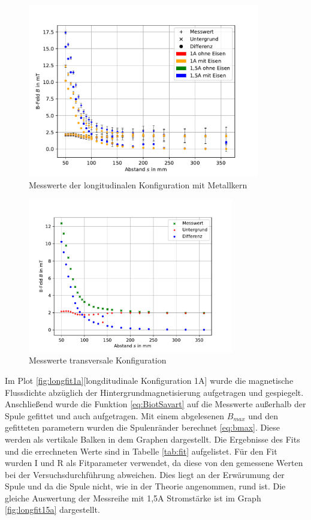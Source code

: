 \documentclass[11pt, a4paper]{article}
\begin{document}
    \begin{figure}[h]
        \centering
        \includegraphics[width=0.9\textwidth]{mitKernRaw.pdf}
        \caption{Messwerte der longitudinalen Konfiguration mit Metallkern}
        \label{fig:longmessmitKern}
    \end{figure}
    \begin{figure}[h]
        \centering
        \includegraphics[width=0.8\textwidth]{raw2.pdf}
        \caption{Messwerte transversale Konfiguration}
        \label{fig:transmess}
    \end{figure}



    Im Plot \ref{fig:longfit1a}[longditudinale Konfiguration 1\si{\ampere}] wurde die magnetische Flussdichte abzüglich der Hintergrundmagnetisierung aufgetragen und gespiegelt. Anschließend wurde die Funktion \ref{eq:BiotSavart} auf die Messwerte außerhalb der Spule gefittet und auch aufgetragen. Mit einem abgelesenen $B_{max}$ und den gefitteten parametern wurden die Spulenränder berechnet \ref{eq:bmax}. Diese werden als vertikale Balken in dem Graphen dargestellt. 
    Die Ergebnisse des Fits und die errechneten Werte sind in Tabelle \ref{tab:fit} aufgelistet. Für den Fit wurden I und R als Fitparameter verwendet, da diese von den gemessene Werten bei der Versuchsdurchführung abweichen. Dies liegt an der Erwärumung der Spule und da die Spule nicht, wie in der Theorie angenommen, rund ist.
    Die gleiche Auswertung der Messreihe mit 1,5A Stromstärke ist im Graph \ref{fig:longfit15a} dargestellt.
    
\end{document}
